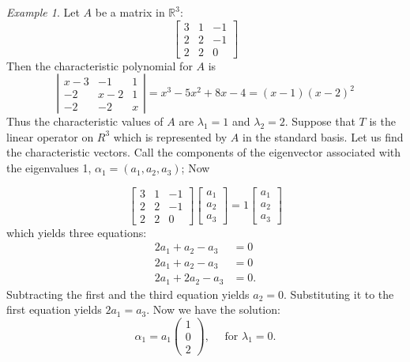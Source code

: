 \documentclass{book}
\theoremstyle{remark}
\newtheorem{example}{Example}[section]
\theoremstyle{definition}
\begin{document}
\begin{example}
    Let $A$ be a matrix in $\mathbb{R}^3$:
$$
\left[\begin{array}{rrr}
3 & 1 & -1 \\
2 & 2 & -1 \\
2 & 2 & 0
\end{array}\right]
$$
Then the characteristic polynomial for $A$ is
$$
\left|\begin{array}{ccc}
x-3 & -1 & 1 \\
-2 & x-2 & 1 \\
-2 & -2 & x
\end{array}\right|=x^3-5 x^2+8 x-4=(x-1)(x-2)^2
$$
Thus the characteristic values of $A$ are $\lambda_1 = 1$ and $\lambda_2 = 2$.
Suppose that $T$ is the linear operator on $R^3$ which is represented by $A$ in the standard basis. Let us find the characteristic vectors. Call the components of the eigenvector associated with the eigenvalues 1, $\alpha_1 = \left(a_1, a_2, a_3\right)$; Now

$$
\left[\begin{array}{rrr}
3 & 1 & -1 \\
2 & 2 & -1 \\
2 & 2 & 0
\end{array}\right]
\left[\begin{array}{l}
a_1 \\
a_2 \\
a_3
\end{array}\right]=
1
\left[\begin{array}{l}
a_1 \\
a_2 \\
a_3
\end{array}\right]
$$
which yields three equations:
$$
\begin{aligned}
2 a_1 + a_2 -  a_3 & =0 \\
2 a_1 + a_2 -  a_3 & =0 \\
2 a_1 + 2a_2 -  a_3 & =0.
\end{aligned}
$$
Subtracting the first and the third equation yields $a_2 = 0$. Substituting it to the first equation yields $2a_1 = a_3$. 
Now we have the solution: 
$$
\alpha_1=a_1\left(\begin{array}{l}
1 \\
0 \\
2
\end{array}\right), \quad \text { for } \lambda_1=0.
$$


\end{example}
\end{document}
